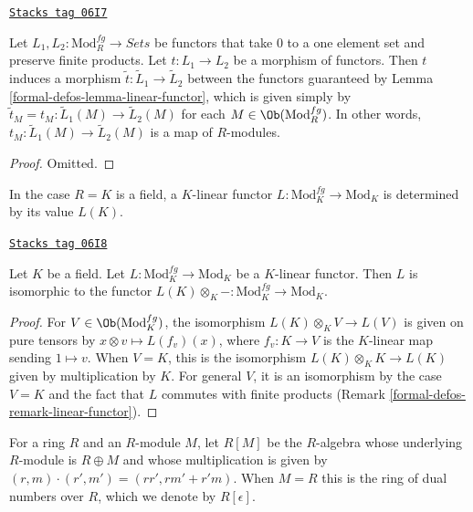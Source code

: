 \begin{lemma}
\label{formal-defos-lemma-morphism-linear-functors}
\href{https://stacks.math.columbia.edu/tag/06I7}{\texttt{Stacks tag 06I7}}

Let $L_1, L_2: \text{Mod}^{fg}_R \to \textit{Sets}$ be
functors that take $0$ to a one element set and preserve finite products.
Let $t : L_1 \to L_2$ be a morphism of functors. Then $t$ induces a morphism
$\widetilde{t} : \widetilde{L}_1 \to \widetilde{L}_2$ between the
functors guaranteed by Lemma \ref{formal-defos-lemma-linear-functor}, which is given simply
by $\widetilde{t}_M = t_M: \widetilde{L}_1(M) \to \widetilde{L}_2(M)$
for each $M \in \Ob(\text{Mod}^{fg}_R)$. In other words,
$t_M: \widetilde{L}_1(M) \to \widetilde{L}_2(M)$ is a map of $R$-modules.
\end{lemma}

\begin{proof}
Omitted.
\end{proof}

In the case $R = K$ is a field, a $K$-linear functor
$L : \text{Mod}^{fg}_K \to \text{Mod}_K$ is determined by its value $L(K)$.

\begin{lemma}
\label{formal-defos-lemma-linear-functor-over-field}
\href{https://stacks.math.columbia.edu/tag/06I8}{\texttt{Stacks tag 06I8}}

Let $K$ be a field. Let $L: \text{Mod}^{fg}_K \to
\text{Mod}_K$ be a $K$-linear functor.  Then $L$ is isomorphic to the
functor $L(K) \otimes_K - : \text{Mod}^{fg}_K \to
\text{Mod}_K$.
\end{lemma}

\begin{proof}
For $V \in \Ob(\text{Mod}^{fg}_K)$, the isomorphism
$L(K) \otimes_K V \to L(V)$ is given on pure tensors by
$x \otimes v \mapsto L(f_v)(x)$, where $f_v: K \to V$ is the $K$-linear map
sending $1 \mapsto v$.  When $V = K$, this is the isomorphism
$L(K) \otimes_K K \to L(K)$ given by multiplication by $K$.
For general $V$, it is an isomorphism by the case $V = K$ and the
fact that $L$ commutes with finite
products (Remark \ref{formal-defos-remark-linear-functor}).
\end{proof}

For a ring $R$ and an $R$-module $M$, let $R[M]$ be the $R$-algebra whose
underlying $R$-module is $R \oplus M$ and whose multiplication is given by
$(r, m) \cdot (r', m') = (rr', rm' + r'm)$.  When $M = R$ this is the ring of
dual numbers over $R$, which we denote by $R[\epsilon]$.

